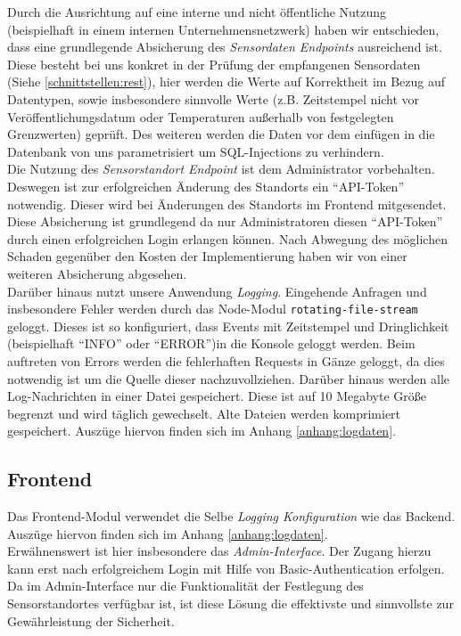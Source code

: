 Durch die Ausrichtung auf eine interne und nicht öffentliche Nutzung (beispielhaft in einem internen Unternehmensnetzwerk) haben wir entschieden, dass eine grundlegende Absicherung des \textit{Sensordaten Endpoints} ausreichend ist.
Diese besteht bei uns konkret in der Prüfung der empfangenen Sensordaten (Siehe \cref{schnittstellen:rest}), hier werden die Werte auf Korrektheit im Bezug auf Datentypen, sowie insbesondere sinnvolle Werte (z.B. Zeitstempel nicht vor Veröffentlichungsdatum oder Temperaturen außerhalb von festgelegten Grenzwerten) geprüft.
Des weiteren werden die Daten vor dem einfügen in die Datenbank von uns parametrisiert um SQL-Injections zu verhindern.\\
Die Nutzung des \textit{Sensorstandort Endpoint} ist dem Administrator vorbehalten.
Deswegen ist zur erfolgreichen Änderung des Standorts ein \enquote{API-Token} notwendig.
Dieser wird bei Änderungen des Standorts im Frontend mitgesendet.
Diese Absicherung ist grundlegend da nur Administratoren diesen \enquote{API-Token} durch einen erfolgreichen Login erlangen können.
Nach Abwegung des möglichen Schaden gegenüber den Kosten der Implementierung haben wir von einer weiteren Absicherung abgesehen.\\
Darüber hinaus nutzt unsere Anwendung \textit{Logging}.
Eingehende Anfragen und insbesondere Fehler werden durch das Node-Modul \texttt{rotating-file-stream} geloggt.
Dieses ist so konfiguriert, dass Events mit Zeitstempel und Dringlichkeit (beispielhaft \enquote{INFO} oder \enquote{ERROR})in die Konsole geloggt werden.
Beim auftreten von Errors werden die fehlerhaften Requests in Gänze geloggt, da dies notwendig ist um die Quelle dieser nachzuvollziehen.
Darüber hinaus werden alle Log-Nachrichten in einer Datei gespeichert.
Diese ist auf 10 Megabyte Größe begrenzt und wird täglich gewechselt.
Alte Dateien werden komprimiert gespeichert.
Auszüge hiervon finden sich im Anhang \ref{anhang:logdaten}.

\subsection{Frontend}

Das Frontend-Modul verwendet die Selbe \textit{Logging Konfiguration} wie das Backend.
Auszüge hiervon finden sich im Anhang \ref{anhang:logdaten}.\\
Erwähnenswert ist hier insbesondere das \textit{Admin-Interface}.
Der Zugang hierzu kann erst nach erfolgreichem Login mit Hilfe von Basic-Authentication erfolgen.
Da im Admin-Interface nur die Funktionalität der Festlegung des Sensorstandortes verfügbar ist, ist diese Lösung die effektivste und sinnvollste zur Gewährleistung der Sicherheit.

